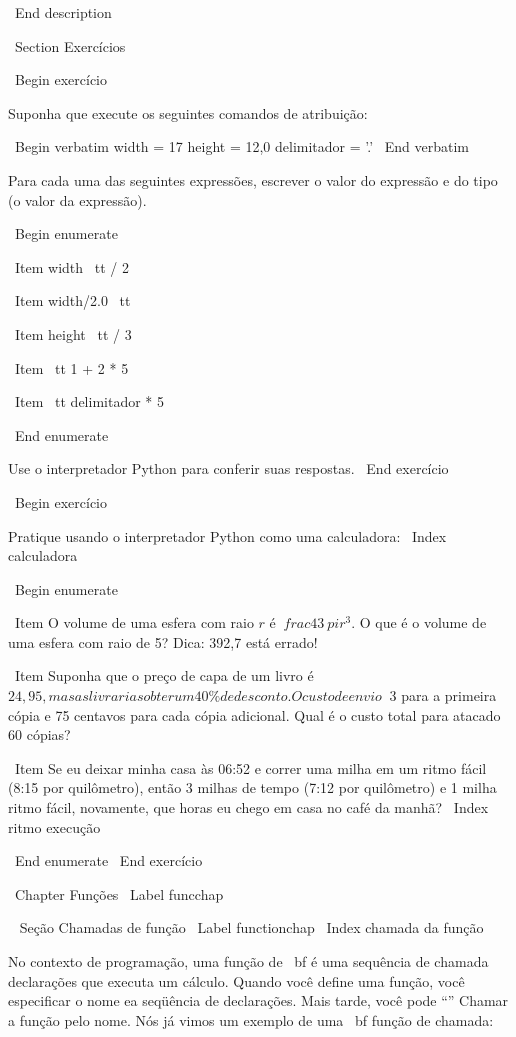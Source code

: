 \documentclass[10pt]{book}
\begin{document}
{\ End {description}


\ Section {Exercícios}

\ Begin {} exercício

Suponha que execute os seguintes comandos de atribuição:

\ Begin {verbatim}
width = 17
height = 12,0
delimitador = '.'
\ End {verbatim}

Para cada uma das seguintes expressões, escrever o valor do
expressão e do tipo (o valor da expressão).

\ Begin {enumerate}

\ Item {width \ tt / 2}

\ Item {width/2.0 \ tt}

\ Item {height \ tt / 3}

\ Item {\ tt 1 + 2 * 5}

\ Item {\ tt delimitador * 5}

\ End {enumerate}

Use o interpretador Python para conferir suas respostas.
\ End {} exercício

\ Begin {} exercício

Pratique usando o interpretador Python como uma calculadora: 
\ Index {calculadora}

\ Begin {enumerate}

\ Item O volume de uma esfera com raio $ r $ é $ \ frac {4} {3} \ pi r ^ 3 $.
  O que é o volume de uma esfera com raio de 5? Dica: 392,7 está errado!

\ Item Suponha que o preço de capa de um livro é \ $ 24,95, mas as livrarias obter um
  40 \% de desconto. O custo de envio \ $ 3 para a primeira cópia e 75 centavos
  para cada cópia adicional. Qual é o custo total para atacado
  60 cópias?

\ Item Se eu deixar minha casa às 06:52 e correr uma milha em um ritmo fácil
  (8:15 por quilômetro), então 3 milhas de tempo (7:12 por quilômetro) e 1 milha
  ritmo fácil, novamente, que horas eu chego em casa no café da manhã?
\ Index {ritmo execução}

\ End {enumerate}
\ End {} exercício


\ Chapter {Funções}
\ Label {} funcchap

\ {} Seção Chamadas de função
\ Label {} functionchap
\ Index {chamada da função}

No contexto de programação, uma função de {\ bf} é uma sequência de chamada
declarações que executa um cálculo. Quando você define uma função,
você especificar o nome ea seqüência de declarações. Mais tarde, você pode
``'' Chamar a função pelo nome.  
Nós já vimos um exemplo de uma {\ bf função de chamada}:

}
\end{document}
